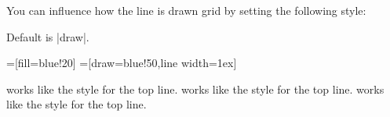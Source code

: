 \begin{itemize}
\begin{itemize}
\begin{codeexample}[]
\end{codeexample}
  \end{itemize}
  You can influence how the line is drawn grid by setting
  the following style:
  \begin{itemize}
    Default is |draw|.
\begin{codeexample}[]
=[fill=blue!20]    
=[draw=blue!50,line width=1ex]
\end{codeexample}
  \end{itemize}
  works like the style for the top line.
  works like the style for the top line.
  works like the style for the top line.
\end{itemize}



